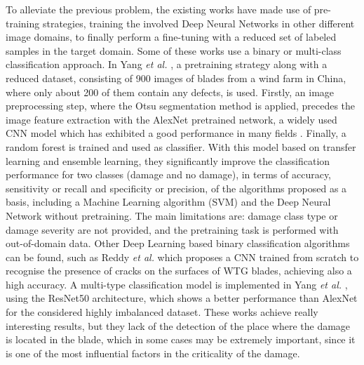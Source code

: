 To alleviate the previous problem, the existing works have made use of pre-training strategies, training the involved Deep Neural Networks in other different image domains, to finally perform a fine-tuning with a reduced set of labeled samples in the target domain. Some of these works use a binary or multi-class classification approach. In Yang \emph{et al.} \cite{xiyun2021image}, a pretraining strategy along with a reduced dataset, consisting of 900 images of blades from a wind farm in China, where only about 200 of them contain any defects, is used. Firstly, an image preprocessing step, where the Otsu segmentation method is applied, precedes the image feature extraction with the AlexNet pretrained network, a widely used CNN model which has exhibited a good performance in many fields \cite{alex2012alexnet}. Finally, a random forest is trained and used as classifier. With this model based on transfer learning and ensemble learning, they significantly improve the classification performance for two classes (damage and no damage), in terms of accuracy, sensitivity or recall and specificity or precision, of the algorithms proposed as a basis, including a Machine Learning  algorithm (SVM) and the Deep Neural Network without pretraining. The main limitations are: damage class type or damage severity are not provided, and the pretraining task is performed with out-of-domain data. Other Deep Learning based binary classification algorithms can be found, such as Reddy \emph{et al.} \cite{reddy2019detection} which proposes a CNN trained from scratch to recognise the presence of cracks on the surfaces of WTG blades, achieving also a high accuracy. A multi-type classification model is implemented in Yang \emph{et al.} \cite{yang2020surface}, using the ResNet50 architecture, which shows a better performance than AlexNet for the considered highly imbalanced dataset. These works achieve really interesting results, but they lack of the detection of the place where the damage is located in the blade, which in some cases may be extremely important, since it is one of the most influential factors in the criticality of the damage.

